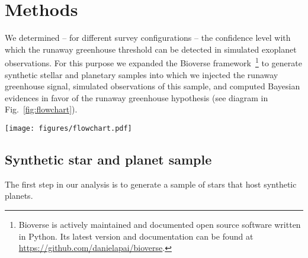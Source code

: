 \documentclass[twocolumn]{aastex631}
\begin{document}
\section{Methods}\label{sec:methods}

We determined -- for different survey configurations -- the confidence level with which the runaway greenhouse threshold can be detected in simulated exoplanet observations.
For this purpose we expanded the Bioverse framework~\citep{Bixel2020,Bixel2021}\footnote{Bioverse is actively maintained and documented open source software written in Python. Its latest version and documentation can be found at \url{https://github.com/danielapai/bioverse}.} to generate synthetic stellar and planetary samples into which we injected the runaway greenhouse signal, simulated observations of this sample, and computed Bayesian evidences in favor of the runaway greenhouse hypothesis (see diagram in Fig.~\ref{fig:flowchart}).
\begin{figure*}
    \begin{centering}
        \texttt{[image: figures/flowchart.pdf]}
        \caption{Workflow of our hypothesis testing with Bioverse. In the first block, we generate a sample of stars and populate them with planets based on \kepler\ demographics.
            A fraction of them are then assigned a runaway greenhouse climate based on the model described in Sect.~\ref{sec:mo_model}.
        The second block simulates an exoplanet survey, whereby selection effects and detection biases are introduced. Finally, the third block deals with testing the runaway greenhouse hypothesis based on data from the survey simulation.
        By iterating through these steps, we compute the statistical power of testing the hypothesis given the assumed survey design.}
        \label{fig:flowchart}
    \end{centering}
\end{figure*}



\subsection{Synthetic star and planet sample}
The first step in our analysis is to generate a sample of stars that host synthetic planets.
\end{document}
